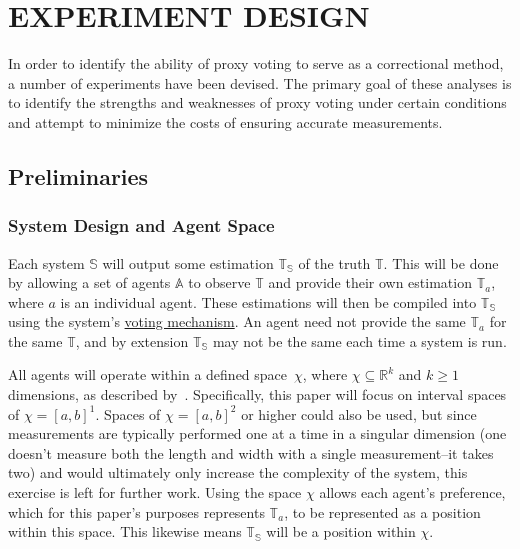 %
%

\chapter{EXPERIMENT DESIGN}\label{ch:experiment-design}
In order to identify the ability of proxy voting to serve as a correctional
method, a number of experiments have been devised.
The primary goal of these analyses is to identify the strengths and
weaknesses of proxy voting under certain conditions and attempt to minimize
the costs of ensuring accurate measurements.

\section{Preliminaries}\label{sec:preliminaries}
\subsection{System Design and Agent Space}\label{subsec:system-design-and
-agent-space}
Each system $\mathbb{S}$ will output some estimation $\mathbb{T}_\mathbb{S}$
of the truth $\mathbb{T}$.
This will be done by allowing a set of agents $\mathbb{A}$ to observe
$\mathbb{T}$ and provide their own estimation $\mathbb{T}_a$, where $a$ is an
individual agent.
These estimations will then be compiled into $\mathbb{T}_\mathbb{S}$ using
the system's \hyperref[subsec:voting-mechanisms]{voting mechanism}.
An agent need not provide the same $\mathbb{T}_a$ for the same $\mathbb{T}$,
and by extension $\mathbb{T}_\mathbb{S}$ may not be the same each time a
system is run.

All agents will operate within a defined space~$\chi$, where $\chi \subseteq
\mathbb{R}^k$ and $k \geq 1$ dimensions, as described
by~\cite[para.~2.1]{Cohensius2017}.
Specifically, this paper will focus on interval spaces of $\chi = [a, b]^1$.
Spaces of $\chi = [a, b]^2$ or higher could also be used, but since
measurements are typically performed one at a time in a singular dimension (one
doesn't measure both the length and width with a single measurement--it takes
two) and would ultimately only increase the complexity of the system, this
exercise is left for further work.
Using the space $\chi$ allows each agent's preference, which for this paper's
purposes represents $\mathbb{T}_a$, to be represented as a position within
this space.
This likewise means $\mathbb{T}_\mathbb{S}$ will be a position within $\chi$.

